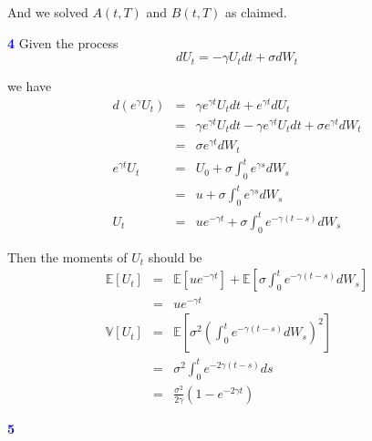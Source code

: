 \documentclass[a4paper,11pt] {article}
\begin{document}
And we solved $A(t,T)$ and $B(t,T)$ as claimed.

\bigskip

\textcolor{blue}{\bf 4 } Given the process
$$
dU_t = -\gamma U_t dt + \sigma dW_t
$$

we have
\begin{eqnarray*}
d(e^{\gamma }U_t) &=& \gamma e^{\gamma t} U_t dt + e^{\gamma t} d U_t \\
                  &=& \gamma e^{\gamma t} U_t dt - \gamma e^{\gamma t} U_t dt +  \sigma e^{\gamma t} dW_t \\
                  &=& \sigma e^{\gamma t} dW_t \\
e^{\gamma t} U_t  &=& U_0 + \sigma \int_{0}^{t}e^{\gamma s} dW_s \\
                  &=& u + \sigma \int_{0}^{t}e^{\gamma s} dW_s \\
U_t               &=& ue^{-\gamma t} + \sigma \int_0^t e^{-\gamma (t-s)} dW_s
\end{eqnarray*}

Then the moments of $U_t$ should be
\begin{eqnarray*}
\mathbb{E}[U_t] &=&  \mathbb{E}[ue^{-\gamma t}] + \mathbb{E}[\sigma \int_0^t e^{-\gamma (t-s)} dW_s] \\
                &=&  ue^{-\gamma t}  \\
\mathbb{V}[U_t] &=&  \mathbb{E}\left[ \sigma^2 \left( \int_0^t e^{-\gamma(t-s)}dW_s \right)^2 \right]  \\
                &=&  \sigma^2 \int_0^t e^{-2\gamma(t-s)} ds \\
                &=&  \frac{\sigma^2}{2\gamma} (1-e^{-2\gamma t})
\end{eqnarray*}

\bigskip

\textcolor{blue}{\bf 5 }
\end{document}
